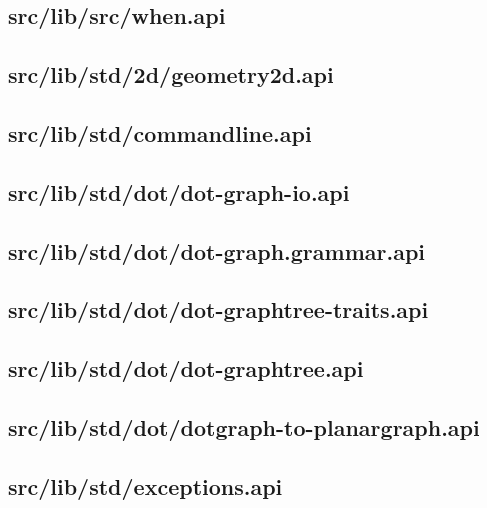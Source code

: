 \subsection{src/lib/src/when.api}


\subsection{src/lib/std/2d/geometry2d.api}


\subsection{src/lib/std/commandline.api}


\subsection{src/lib/std/dot/dot-graph-io.api}


\subsection{src/lib/std/dot/dot-graph.grammar.api}


\subsection{src/lib/std/dot/dot-graphtree-traits.api}


\subsection{src/lib/std/dot/dot-graphtree.api}


\subsection{src/lib/std/dot/dotgraph-to-planargraph.api}


\subsection{src/lib/std/exceptions.api}


